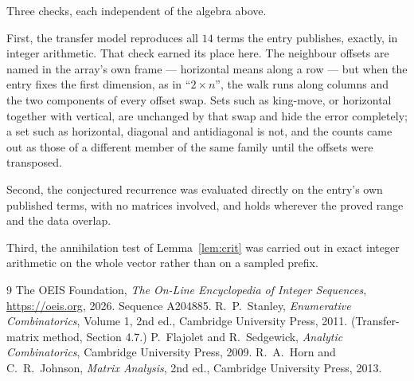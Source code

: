 \documentclass[11pt,a4paper]{article}
\theoremstyle{plain}
\theoremstyle{definition}
\begin{document}
Three checks, each independent of the algebra above.

First, the transfer model reproduces all $14$ terms the entry publishes, exactly, in
integer arithmetic. That check earned its place here. The neighbour offsets are named in the
array's own frame --- horizontal means along a row --- but when the entry fixes the first
dimension, as in ``$2\times n$'', the walk runs along columns and the two components of every
offset swap. Sets such as king-move, or horizontal together with vertical, are unchanged by
that swap and hide the error completely; a set such as horizontal, diagonal and antidiagonal
is not, and the counts came out as those of a different member of the same family until the
offsets were transposed.

Second, the conjectured recurrence was evaluated directly on the entry's own published terms,
with no matrices involved, and holds wherever the proved range and the data overlap.

Third, the annihilation test of Lemma~\ref{lem:crit} was carried out in exact integer
arithmetic on the whole vector rather than on a sampled prefix.

\begin{thebibliography}{9}
 The OEIS Foundation, \emph{The On-Line Encyclopedia of Integer
Sequences}, \url{https://oeis.org}, 2026. Sequence A204885.
 R.~P.~Stanley, \emph{Enumerative Combinatorics}, Volume 1, 2nd ed.,
Cambridge University Press, 2011. (Transfer-matrix method, Section 4.7.)
 P.~Flajolet and R.~Sedgewick, \emph{Analytic Combinatorics}, Cambridge
University Press, 2009.
 R.~A.~Horn and C.~R.~Johnson, \emph{Matrix Analysis}, 2nd ed., Cambridge
University Press, 2013.
\end{thebibliography}
\end{document}
